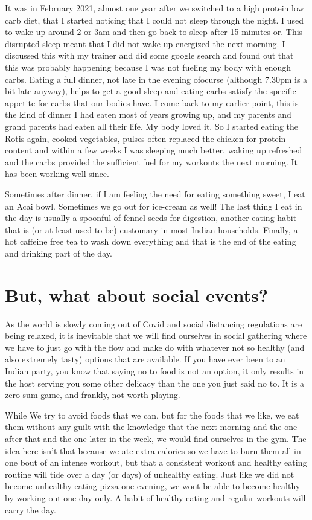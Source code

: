 \documentclass[
  oneside]{book}
\begin{document}
It was in February 2021, almost one year after we switched to a high protein low carb diet, that I started noticing that I could not sleep through the night. I used to wake up around 2 or 3am and then go back to sleep after 15 minutes or. This disrupted sleep meant that I did not wake up energized the next morning. I discussed this with my trainer and did some google search and found out that this was probably happening because I was not fueling my body with enough carbs. Eating a full dinner, not late in the evening ofocurse (although 7.30pm is a bit late anyway), helps to get a good sleep and eating carbs satisfy the specific appetite for carbs that our bodies have. I come back to my earlier point, this is the kind of dinner I had eaten most of years growing up, and my parents and grand parents had eaten all their life. My body loved it. So I started eating the Rotis again, cooked vegetables, pulses often replaced the chicken for protein content and within a few weeks I was sleeping much better, waking up refreshed and the carbs provided the sufficient fuel for my workouts the next morning. It has been working well since.

Sometimes after dinner, if I am feeling the need for eating something sweet, I eat an Acai bowl. Sometimes we go out for ice-cream as well! The last thing I eat in the day is usually a spoonful of fennel seeds for digestion, another eating habit that is (or at least used to be) customary in most Indian households. Finally, a hot caffeine free tea to wash down everything and that is the end of the eating and drinking part of the day.

\hypertarget{but-what-about-social-events}{%
\section{But, what about social events?}\label{but-what-about-social-events}}

As the world is slowly coming out of Covid and social distancing regulations are being relaxed, it is inevitable that we will find ourselves in social gathering where we have to just go with the flow and make do with whatever not so healthy (and also extremely tasty) options that are available. If you have ever been to an Indian party, you know that saying no to food is not an option, it only results in the host serving you some other delicacy than the one you just said no to. It is a zero sum game, and frankly, not worth playing.

While We try to avoid foods that we can, but for the foods that we like, we eat them without any guilt with the knowledge that the next morning and the one after that and the one later in the week, we would find ourselves in the gym. The idea here isn't that because we ate extra calories so we have to burn them all in one bout of an intense workout, but that a consistent workout and healthy eating routine will tide over a day (or days) of unhealthy eating. Just like we did not become unhealthy eating pizza one evening, we wont be able to become healthy by working out one day only. A habit of healthy eating and regular workouts will carry the day.
\end{document}
